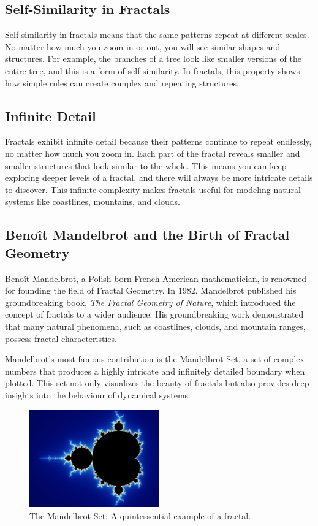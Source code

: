 \documentclass[12pt]{article}
\begin{document}
\subsection{Self-Similarity in Fractals}
Self-similarity in fractals means that the same patterns repeat at different scales. No matter how much you zoom in or out, you will see similar shapes and structures. For example, the branches of a tree look like smaller versions of the entire tree, and this is a form of self-similarity. In fractals, this property shows how simple rules can create complex and repeating structures.

\subsection{Infinite Detail}
Fractals exhibit infinite detail because their patterns continue to repeat endlessly, no matter how much you zoom in. Each part of the fractal reveals smaller and smaller structures that look similar to the whole. This means you can keep exploring deeper levels of a fractal, and there will always be more intricate details to discover. This infinite complexity makes fractals useful for modeling natural systems like coastlines, mountains, and clouds.

\subsection{Benoît Mandelbrot and the Birth of Fractal Geometry}
Benoît Mandelbrot, a Polish-born French-American mathematician, is renowned for founding the field of Fractal Geometry. In 1982, Mandelbrot published his groundbreaking book, \emph{The Fractal Geometry of Nature}, which introduced the concept of fractals to a wider audience. His groundbreaking work demonstrated that many natural phenomena, such as coastlines, clouds, and mountain ranges, possess fractal characteristics. 

Mandelbrot's most famous contribution is the Mandelbrot Set, a set of complex numbers that produces a highly intricate and infinitely detailed boundary when plotted. This set not only visualizes the beauty of fractals but also provides deep insights into the behaviour of dynamical systems.

\begin{figure}[h]
\centering
\includegraphics[width=0.5\textwidth]{assets/mandelbrot-set.jpg}
\caption{The Mandelbrot Set: A quintessential example of a fractal.}
\label{fig:mandelbrot}
\end{figure}
\end{document}
